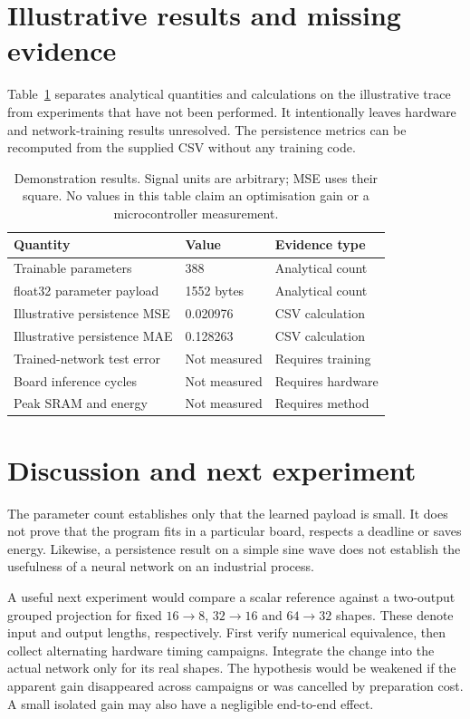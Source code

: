 \documentclass[preprint,11pt,a4paper]{elsarticle}
\begin{document}
\section{Illustrative results and missing evidence}
Table~\ref{tab:results} separates analytical quantities and calculations on the illustrative trace from experiments that have not been performed. It intentionally leaves hardware and network-training results unresolved. The persistence metrics can be recomputed from the supplied CSV without any training code.
\begin{table}[htbp]
\centering\small
\begin{tabular}{p{.42\linewidth}p{.20\linewidth}p{.25\linewidth}}
\toprule Quantity & Value & Evidence type \\
\midrule
Trainable parameters & 388 & Analytical count \\
float32 parameter payload & 1552 bytes & Analytical count \\
Illustrative persistence MSE & 0.020976 & CSV calculation \\
Illustrative persistence MAE & 0.128263 & CSV calculation \\
Trained-network test error & Not measured & Requires training \\
Board inference cycles & Not measured & Requires hardware \\
Peak SRAM and energy & Not measured & Requires method \\
\bottomrule
\end{tabular}
\caption{Demonstration results. Signal units are arbitrary; MSE uses their square. No values in this table claim an optimisation gain or a microcontroller measurement.}
\label{tab:results}
\end{table}

\section{Discussion and next experiment}
The parameter count establishes only that the learned payload is small. It does not prove that the program fits in a particular board, respects a deadline or saves energy. Likewise, a persistence result on a simple sine wave does not establish the usefulness of a neural network on an industrial process.

A useful next experiment would compare a scalar reference against a two-output grouped projection for fixed $16\!\rightarrow\!8$, $32\!\rightarrow\!16$ and $64\!\rightarrow\!32$ shapes. These denote input and output lengths, respectively. First verify numerical equivalence, then collect alternating hardware timing campaigns. Integrate the change into the actual network only for its real shapes. The hypothesis would be weakened if the apparent gain disappeared across campaigns or was cancelled by preparation cost. A small isolated gain may also have a negligible end-to-end effect.
\end{document}
